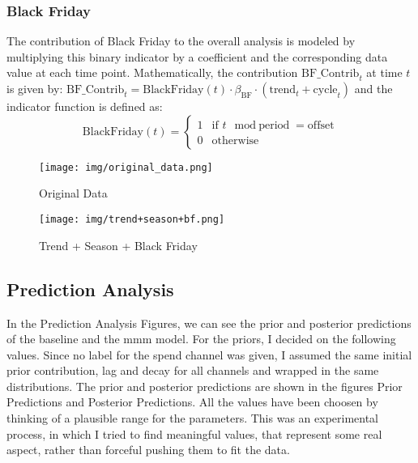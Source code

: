 \documentclass{article}
\begin{document}
\subsubsection{Black Friday}
\noindent
The contribution of Black Friday to the overall analysis is modeled by multiplying this binary indicator by a coefficient and the corresponding data value at each time point. Mathematically, the contribution \( \mathrm{BF\_Contrib}_t \) at time \( t \) is given by:
$\mathrm{BF\_Contrib}_t = \mathrm{BlackFriday}(t) \cdot \beta_{\mathrm{BF}} \cdot (\text{trend}_t+\text{cycle}_t)$ and the indicator function is defined as:
\[
\mathrm{BlackFriday}(t) = 
\begin{cases} 
1 & \text{if } t \mod \text{period} = \text{offset} \\ 
0 & \text{otherwise} 
\end{cases}
\]


\begin{figure}[H]
    \centering
    \begin{minipage}[t]{0.48\textwidth}
        \centering
        \texttt{[image: img/original\_data.png]}
        \caption{Original Data}
        \label{fig:original_data}
    \end{minipage}
    \hfill
    \begin{minipage}[t]{0.48\textwidth}
        \centering
        \texttt{[image: img/trend+season+bf.png]}
        \caption{Trend + Season + Black Friday}
        \label{fig:trend_season_bf}
    \end{minipage}
\end{figure}



\subsection{Prediction Analysis}

In the Prediction Analysis Figures, we can see the prior and posterior predictions of the baseline and the mmm model.
For the priors, I decided on the following values. Since no label for the spend channel was given, I assumed the same initial prior contribution, lag and decay for all channels
and wrapped in the same distributions. The prior and posterior predictions are shown in the figures Prior Predictions and Posterior Predictions. All the values have been choosen by thinking of a plausible range for the parameters. This was an experimental process, in which I tried to find meaningful values, that represent some real aspect, rather than forceful pushing them to fit the data.
\end{document}
